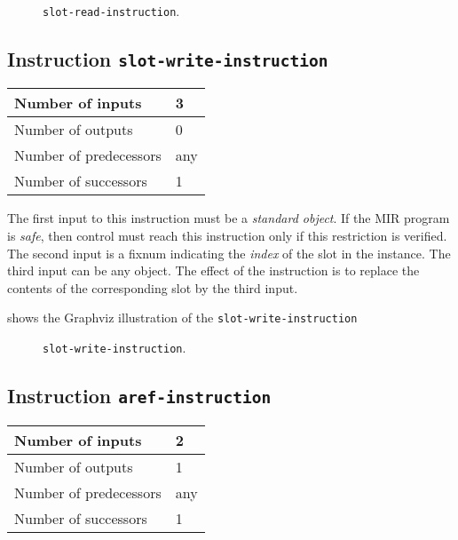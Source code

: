 \begin{figure}
\begin{center}
\end{center}
\caption{\label{fig-slot-read-instruction}
\texttt{slot-read-instruction}.}
\end{figure}

\subsection{Instruction \texttt{slot-write-instruction}}
\label{mir-instruction-slot-write}

\begin{tabular}{|l|l|}
\hline
Number of inputs & 3\\
\hline
Number of outputs & 0\\
\hline
Number of predecessors & any\\
\hline
Number of successors & 1\\
\hline
\end{tabular}

The first input to this instruction must be a \emph{standard object}.
If the MIR program is \emph{safe}, then control must reach this
instruction only if this restriction is verified.  The second input is
a fixnum indicating the \emph{index} of the slot in the instance.  The
third input can be any object.  The effect of the instruction is to
replace the contents of the corresponding slot by the third input.

 shows the Graphviz illustration of the
\texttt{slot-write-instruction}

\begin{figure}
\begin{center}
\end{center}
\caption{\label{fig-slot-write-instruction}
\texttt{slot-write-instruction}.}
\end{figure}

\subsection{Instruction \texttt{aref-instruction}}
\label{mir-instruction-aref}

\begin{tabular}{|l|l|}
\hline
Number of inputs & 2\\
\hline
Number of outputs & 1\\
\hline
Number of predecessors & any\\
\hline
Number of successors & 1\\
\hline
\end{tabular}

